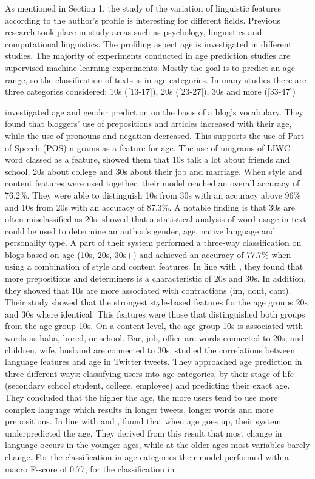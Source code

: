 \documentclass{clv3}
\begin{document}
As mentioned in Section 1, the study of the variation of linguistic features according to the author's profile is interesting for different fields. Previous research took place in study areas such as psychology, linguistics and computational linguistics. The profiling aspect age is investigated in different studies. The majority of experiments conducted in age prediction studies are supervised machine learning experiments. Mostly the goal is to predict an age range, so the classification of texts is in age categories. In many studies there are three categories considered: 10s ([13-17]), 20s ([23-27]), 30s and more ([33-47]) \citep{argamon2009automatically}

\citet{schler2006effects} investigated age and gender prediction on the basis of a blog's vocabulary. They found that bloggers' use of prepositions and articles increased with their age, while the use of pronouns and negation decreased. This supports the use of Part of Speech (POS) n-grams as a feature for age. The use of unigrams of LIWC word classed as a feature, showed them that 10s talk a lot about friends and school, 20s about college and 30s about their job and marriage. When style and content features were used together, their model reached an overall accuracy of 76.2\%. They were able to distinguish 10s from 30s with an accuracy above 96\% and 10s from 20s  with an accuracy of 87.3\%. A notable finding is that 30s are often misclassified as 20s. \citet{argamon2009automatically} showed that a statistical analysis of word usage in text could be used to determine an author's gender, age, native language and personality type.  A part of their system performed a three-way classification on blogs based on age (10s, 20s, 30s+) and achieved an accuracy of 77.7\% when using a combination of style and content features. In line with \citet{schler2006effects}, they found that more prepositions and determiners is a characteristic of 20s and 30s. In addition, they showed that 10s are more associated with contractions (im, dont, cant). Their study showed that the strongest style-based features for the age groups 20s and 30s where identical. This features were those that distinguished both groups from the age group 10s. On a content level, the age group 10s is associated with words as haha, bored, or school. Bar, job, office are words connected to 20s, and children, wife, husband are connected to 30s. \citet{nguyen2013old} studied the correlations between language features and age in Twitter tweets. They approached age prediction in three different ways: classifying users into age categories, by their stage of life (secondary school student, college, employee) and predicting their exact age. They concluded that the higher the age, the more users tend to use more complex language which results in longer tweets, longer words and more prepositions. In line with \citet{schler2006effects} and \citet{argamon2009automatically}, \citeauthor{nguyen2013old} found that when age goes up, their system underpredicted the age. They derived from this result that most change in language occurs in the younger ages, while at the older ages most variables barely change. For the classification in age categories their model performed with a macro F-score of 0.77, for the classification in 
\end{document}
